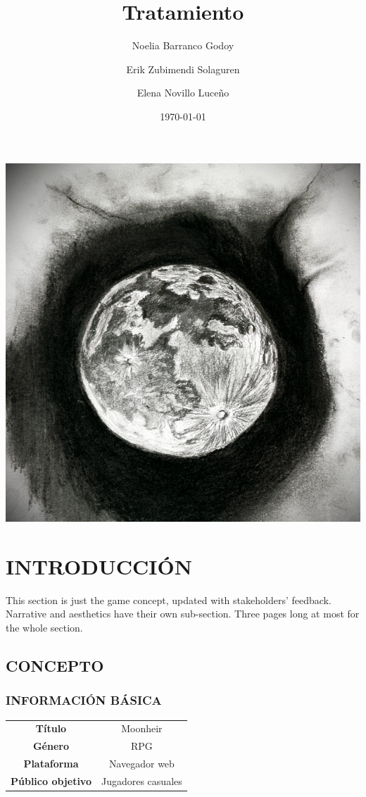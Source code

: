 \documentclass{article}
\title{Tratamiento} %
\author{Noelia Barranco Godoy
\and Erik Zubimendi Solaguren\and
Elena Novillo Luceño}
\date{\today} %
\begin{document}
    \begin{titlepage}
        \maketitle
        \thispagestyle{empty}
        \begin{center}
            \includegraphics[scale=0.125]{moon.jpg}
        \end{center} 
    \end{titlepage}
        

        
    \tableofcontents
    \newpage
    
    \section{INTRODUCCIÓN}
    This section is just the game concept, updated with stakeholders’ feedback. Narrative and aesthetics have their own sub-section. Three pages long at most for the whole section.

    \subsection{CONCEPTO}
    \subsubsection{INFORMACIÓN BÁSICA}
    \begin{tabular}{||c|c||}
        \hline
        \textbf{Título} & Moonheir \\
        \textbf{Género} & RPG\\
        \textbf{Plataforma} & Navegador web\\
        \textbf{Público objetivo} & Jugadores casuales\\
        \hline
    \end{tabular}
\end{document}

